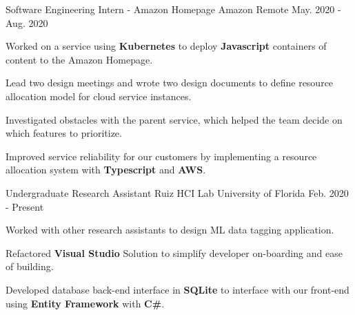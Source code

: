 


\begin{cventries}

	
		\cventry
	{Software Engineering Intern - Amazon Homepage} %
	{Amazon} %
	{Remote} %
	{May. 2020 - Aug. 2020} %
	{ %
		\begin{cvitems}
			\setlength{\itemindent}{.125in}
			\item {Worked on a service using \textbf{Kubernetes} to deploy \textbf{Javascript}  containers of content  to the Amazon Homepage.}
			\item {Lead two design meetings and wrote two design documents to define resource allocation model for cloud service instances.}
			\item {Investigated obstacles with the parent service, which helped the team decide on which features to prioritize.}
			\item {Improved service reliability for our customers by implementing a resource allocation system with \textbf{Typescript} and \textbf{AWS}. }
		\end{cvitems}
	}
	
	
			\cventry
	{Undergraduate Research Assistant} %
	{Ruiz HCI Lab} %
	{University of Florida} %
	{Feb. 2020 - Present} %
	{ %
		\begin{cvitems}
			\setlength{\itemindent}{.125in}
			\item {Worked with other research assistants to design ML data tagging application.}
			\item {Refactored \textbf{Visual Studio} Solution to simplify  developer on-boarding and ease of building.}
			\item {Developed  database back-end interface in \textbf{SQLite} to interface with our front-end using \textbf{Entity Framework} with \textbf{C\#}.}
		\end{cvitems}
	}
	

\end{cventries}

